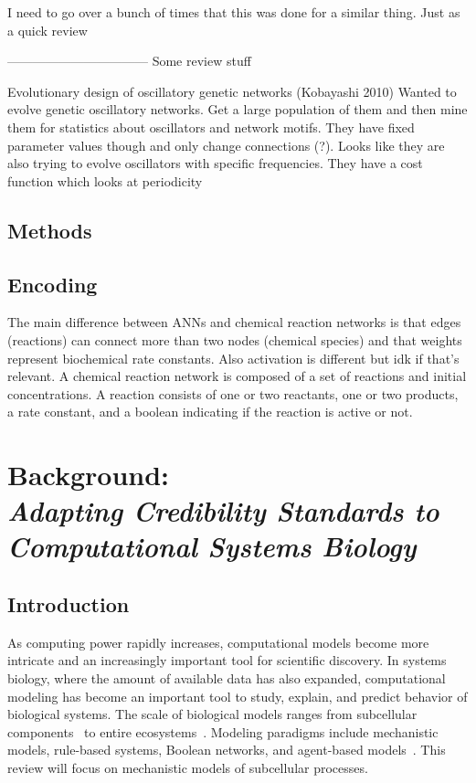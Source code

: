 \documentclass[12pt]{report}
\begin{document}
I need to go over a bunch of times that this was done for a similar thing. Just as a quick review


---------------------------------
Some review stuff


Evolutionary design of oscillatory genetic networks (Kobayashi 2010)
Wanted to evolve genetic oscillatory networks. Get a large population of them and then mine them for statistics about oscillators and network motifs. They have fixed parameter values though and only change connections (?). Looks like they are also trying to evolve oscillators with specific frequencies. They have a cost function which looks at periodicity




\section{Methods}
\section{Encoding}
The main difference between ANNs and chemical reaction networks is that edges (reactions) can connect more than two nodes (chemical species) and that weights represent biochemical rate constants. Also activation is different but idk if that's relevant.
A chemical reaction network is composed of a set of reactions and initial concentrations.  A reaction consists of one or two reactants, one or two products, a rate constant, and a boolean indicating if the reaction is active or not.














\chapter{Background: \\\textit{Adapting Credibility Standards to Computational Systems Biology}}


\section{Introduction}

As computing power rapidly increases, computational models become more intricate and an increasingly important tool for scientific discovery. In systems biology, where the amount of available data has also expanded, computational modeling has become an important tool to study, explain, and predict behavior of biological systems. The scale of biological models ranges from subcellular components~\cite{Wang2021} to entire ecosystems~\cite{Hassell2021}. Modeling paradigms include mechanistic models, rule-based systems, Boolean networks, and agent-based models~\cite{Bartocci2016}. This review will focus on mechanistic models of subcellular processes.
\end{document}

